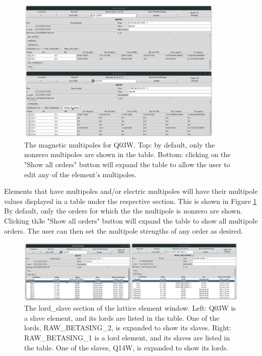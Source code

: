\begin{figure}
\centering
\includegraphics[width=10cm]{figures/lat_element_multipoles.pdf}
\caption[The magnetic multipoles for Q03W.]{The magnetic multipoles for Q03W.
Top: by default, only the nonzero multipoles are shown in the table.
Bottom: clicking on the "Show all orders" button will expand the table to allow the user to edit any of the element's multipoles.}
\label{fig:gui.lat.element.multipoles}
\end{figure}
Elements that have multipoles and/or electric multipoles will have their multipole values displayed in a table under the respective section.
This is shown in Figure \ref{fig:gui.lat.element.multipoles}
By default, only the orders for which the the multipole is nonzero are shown.
Clicking th3e "Show all orders" button will expand the table to show all multipole orders.
The user can then set the multipole strengths of any order as desired.

\begin{figure}
\centering
\includegraphics[width=12cm]{figures/lat_lord_slave.pdf}
\caption[The lord_slave section of the lattice element window.]{The lord_slave section of the lattice element window.
Left: Q03W is a slave element, and its lords are listed in the table.
One of the lords, RAW_BETASING_2, is expanded to show its slaves.
Right: RAW_BETASING_1 is a lord element, and its slaves are listed in the table.
One of the slaves, Q14W, is expanded to show its lords.}
\label{fig:gui.lat.element.lordslave}
\end{figure}

